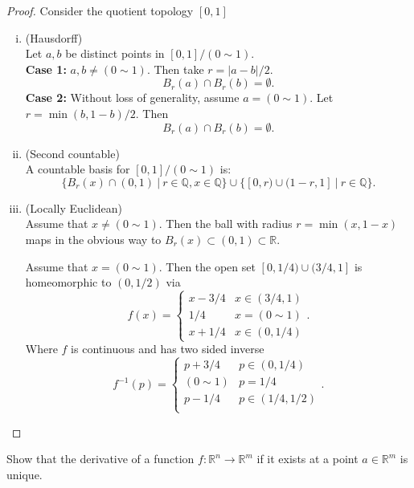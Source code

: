 \documentclass{article}
\newenvironment{problem}[2][Problem]{\begin{trivlist}
\item[\hskip \labelsep {\bfseries #1}\hskip \labelsep {\bfseries #2.}]}{\end{trivlist}}
\begin{document}
\begin{proof} Consider the quotient topology $[0, 1]$
  \begin{enumerate}[(i)]
    \item (Hausdorff)\\
    Let $a, b$ be distinct points in $[0, 1]/(0 \sim 1)$.\\
    \textbf{Case 1:} $a, b \not= (0 \sim 1)$.
    Then take $r = |a - b|/2$. \[
      B_r(a) \cap B_r(b) = \emptyset.
    \]
    \textbf{Case 2:} Without loss of generality, assume $a = (0 \sim 1)$.
    Let $r = \min(b, 1 - b)/2$. Then \[
      B_r(a) \cap B_r(b) = \emptyset.
    \]
    \item (Second countable)\\
    A countable basis for $[0, 1]/(0 \sim 1)$ is: \[
      \{ B_r(x) \cap (0, 1)\ |\ r \in \mathbb{Q}, x \in \mathbb{Q}\} \cup \{ [0, r) \cup (1-r, 1]\ |\ r \in \mathbb{Q}\}.
    \]

    \item (Locally Euclidean) \\
      Assume that $x \not= (0 \sim 1)$. Then the ball with radius
      $r = \min(x, 1 - x)$ maps in the obvious way to
      $B_r(x) \subset (0, 1) \subset \mathbb{R}$.

      Assume that $x = (0 \sim 1)$.
      Then the open set $[0, 1/4) \cup (3/4, 1]$
      is homeomorphic to $(0, 1/2)$ via \[
        f(x) = \begin{cases}
          x - 3/4 & x \in (3/4, 1) \\
          1/4     & x = (0 \sim 1) \\
          x + 1/4 & x \in (0, 1/4)
        \end{cases}.
      \] Where $f$ is continuous and has two sided inverse \[
        f^{-1}(p) = \begin{cases}
          p + 3/4 & p \in (0, 1/4) \\
          (0 \sim 1) & p = 1/4 \\
          p - 1/4 & p \in (1/4, 1/2) \\
        \end{cases}.
      \]
  \end{enumerate}
\end{proof}

\pagebreak

\begin{problem}{4}
  Show that the derivative of a function
  $f: \mathbb{R}^n \rightarrow \mathbb{R}^m$
  if it exists at a point $a \in \mathbb{R}^m$ is unique.
\end{problem}
\end{document}

